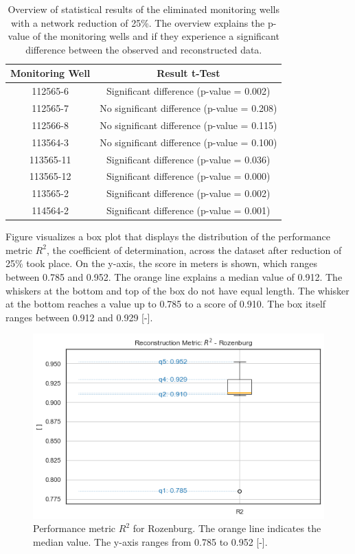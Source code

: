 \begin{table}[htbp]
    \centering
      \caption{Overview of statistical results of the eliminated monitoring wells with a network reduction of 25\%. The overview explains the p-value of the monitoring wells and if they experience a significant difference between the observed and reconstructed data.}
    \begin{tabular}{|c|c|} \hline  
         Monitoring Well& Result t-Test\\ \hline  
         112565-6& Significant difference (p-value = 0.002)\\ \hline  
         112565-7& No significant difference 
(p-value = 0.208)\\ \hline  
         112566-8& No significant difference 
(p-value = 0.115)\\ \hline  
         113564-3& No significant difference 
(p-value = 0.100)\\ \hline  
 113565-11&Significant difference (p-value = 0.036)\\ \hline 
         113565-12& Significant difference (p-value = 0.000)\\ \hline  
         113565-2& Significant difference (p-value = 0.002)\\ \hline  
         114564-2& Significant difference (p-value = 0.001)\\ \hline
    \end{tabular}

    \label{welchroz}
\end{table}
\newpage
\noindent
Figure  visualizes a box plot that displays the distribution of the performance metric $R^2$, the coefficient of determination, across the dataset after reduction of 25\% took place. On the y-axis, the score in meters is shown, which ranges between 0.785 and 0.952. The orange line explains a median value of 0.912. The whiskers at the bottom and top of the box do not have equal length. The whisker at the bottom reaches a value up to 0.785 to a score of 0.910. The box itself ranges between 0.912 and 0.929 [-].

\begin{figure}[htbp]
    \centering
    \includegraphics[width=0.5\linewidth]{frontmatter/Rozenburg-fig/boxroz.png}
    \caption{Performance metric $R^2$ for Rozenburg. 
    The orange line indicates the median value. The y-axis ranges from 0.785 to 0.952 [-].}
    \label{rozbox}
\end{figure}

